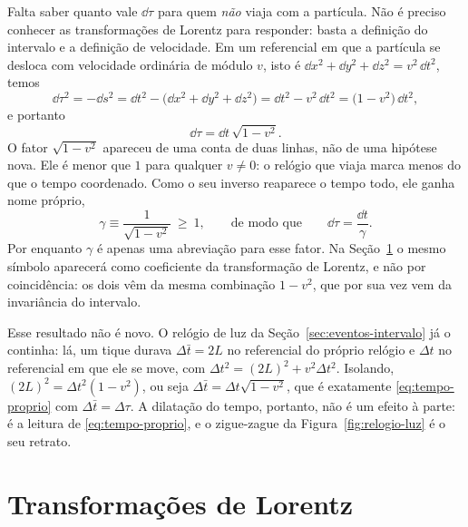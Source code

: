 \documentclass[12pt,a4paper,oneside]{book}
\theoremstyle{rgplain}
\theoremstyle{rgremark}
\begin{document}
Falta saber quanto vale $\dd\tau$ para quem \emph{não} viaja com a partícula.
Não é preciso conhecer as transformações de Lorentz para responder: basta a
definição do intervalo e a definição de velocidade. Em um referencial em que a
partícula se desloca com velocidade ordinária de módulo $v$, isto é
$\dd x^2+\dd y^2+\dd z^2=v^2\,\dd t^2$, temos
\[
  \dd\tau^2=-\dd s^2=\dd t^2-\big(\dd x^2+\dd y^2+\dd z^2\big)
           =\dd t^2-v^2\,\dd t^2=\big(1-v^2\big)\,\dd t^2 ,
\]
e portanto
\begin{equation}
  \dd\tau=\dd t\,\sqrt{1-v^2} .
  \label{eq:tempo-proprio}
\end{equation}
O fator $\sqrt{1-v^2}$ apareceu de uma conta de duas linhas, não de uma
hipótese nova. Ele é menor que $1$ para qualquer $v\ne0$: o relógio que viaja
marca menos do que o tempo coordenado. Como o seu inverso reaparece o tempo
todo, ele ganha nome próprio,
\[
  \gamma\equiv\frac{1}{\sqrt{1-v^2}}\ \ge\ 1,
  \qquad\text{de modo que}\qquad
  \dd\tau=\frac{\dd t}{\gamma} .
\]
Por enquanto $\gamma$ é apenas uma abreviação para esse fator. Na
Seção~\ref{sec:transformacoes-lorentz} o mesmo símbolo aparecerá como
coeficiente da transformação de Lorentz, e não por coincidência: os dois vêm
da mesma combinação $1-v^2$, que por sua vez vem da invariância do intervalo.

Esse resultado não é novo. O relógio de luz da
Seção~\ref{sec:eventos-intervalo} já o continha: lá, um tique durava
$\Delta \bar t=2L$ no referencial do próprio relógio e $\Delta t$ no referencial
em que ele se move, com $\Delta t^2=(2L)^2+v^2\Delta t^2$. Isolando,
$(2L)^2=\Delta t^2(1-v^2)$, ou seja $\Delta \bar t=\Delta t\sqrt{1-v^2}$, que é
exatamente \eqref{eq:tempo-proprio} com $\Delta \bar t=\Delta\tau$. A dilatação do
tempo, portanto, não é um efeito à parte: é a leitura de
\eqref{eq:tempo-proprio}, e o zigue-zague da Figura~\ref{fig:relogio-luz} é o
seu retrato.

\section{Transformações de Lorentz}
\label{sec:transformacoes-lorentz}
\end{document}
